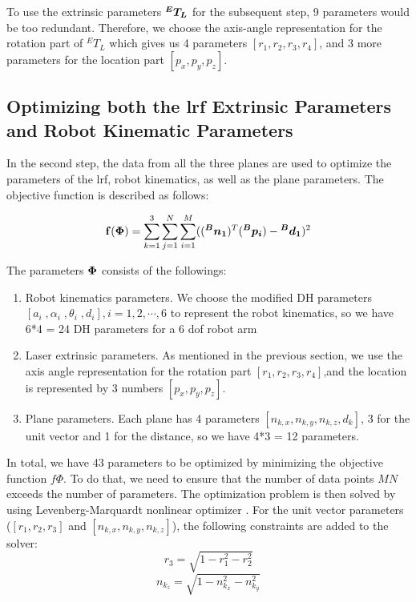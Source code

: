 To use the extrinsic parameters $\vb*{{^E}T_L}$ for the subsequent step, 9 parameters would be too redundant. Therefore, we choose the axis-angle representation for the rotation part of ${^E}T_L$ which gives us 4 parameters $[r_1, r_2, r_3, r_4]$, and 3 more parameters for the location part $[p_x, p_y, p_z]$. 


\subsection{Optimizing both the \ac{lrf} Extrinsic Parameters and Robot Kinematic Parameters}
\label{sec:second_step}
In the second step, the data from all the three planes are used to optimize the parameters of the \ac{lrf}, robot kinematics, as well as the plane parameters. The objective function is described as follows:

\begin{equation}
 \vb{f(\Phi)} =  \sum_{k=1}^{3} \sum_{j=1}^{N} \sum_{i=1}^{M} ((\vb*{{^B}n_1}) ^T (\vb*{{^B}p_i}) - \vb*{{^B}d_1})^2
\end{equation}

The parameters $\vb*{\Phi}$ consists of the followings:
\begin{enumerate}
\item Robot kinematics parameters. We choose the modified DH parameters \cite{Hayati1985} $[a_i \;, \alpha_i \;,\theta_i \;,d_i], i=1, 2, \cdots ,6$ to represent the robot kinematics, so we have 6*4 = 24 DH parameters for a 6 \ac{dof} robot arm
\item Laser extrinsic parameters. As mentioned in the previous section, we use the axis angle representation for the rotation part $[r_1, r_2, r_3, r_4]$,and the location is represented by 3 numbers $[p_x, p_y, p_z]$. 
\item Plane parameters. Each plane has 4 parameters $[n_{k,x}, n_{k,y}, n_{k,z}, d_{k}]$, 3 for the unit vector and 1 for the distance, so we have 4*3 = 12 parameters. 
\end{enumerate}

In total, we have 43 parameters to be optimized by minimizing the objective function $f{\Phi}$. To do that, we need to ensure that the number of data points $MN$ exceeds the number of parameters. The optimization problem is then solved by using Levenberg-Marquardt nonlinear optimizer \cite{Newville2014}. For the unit vector parameters ($[r_1, r_2, r_3]$ and  $[n_{k,x}, n_{k,y}, n_{k,z}]$), the following constraints are added to the solver:
\begin{equation}
\label{eq:10}
r_3 = \sqrt{1 - r_1^2 - r_2^2}
\end{equation}
\begin{equation}
\label{eq:11}
n_{k_z} = \sqrt{1 - n_{k_x}^2 - n_{k_y}^2}
\end{equation}


